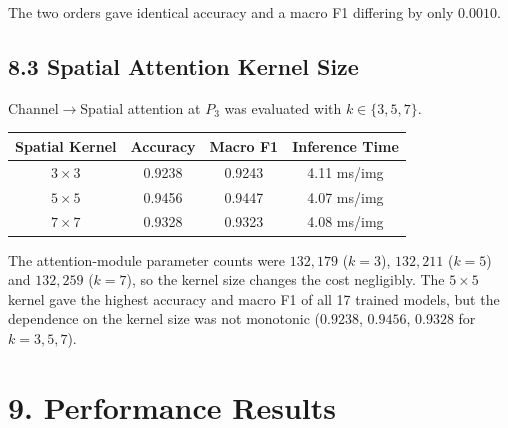\documentclass[10pt]{article}
\begin{document}
The two orders gave identical accuracy and a macro F1 differing by only
$0.0010$.

\subsection*{8.3 Spatial Attention Kernel Size}

Channel$\rightarrow$Spatial attention at $P_3$ was evaluated with
$k\in\{3,5,7\}$.

\begin{center}

\begin{tabular}{|c|c|c|c|}
\hline

\textbf{Spatial Kernel}
&
\textbf{Accuracy}
&
\textbf{Macro F1}
&
\textbf{Inference Time}
\\
\hline

$3\times3$
&
0.9238
&
0.9243
&
4.11 ms/img
\\
\hline

$5\times5$
&
0.9456
&
0.9447
&
4.07 ms/img
\\
\hline

$7\times7$
&
0.9328
&
0.9323
&
4.08 ms/img
\\
\hline

\end{tabular}

\end{center}

The attention-module parameter counts were $132{,}179$ ($k=3$), $132{,}211$
($k=5$) and $132{,}259$ ($k=7$), so the kernel size changes the cost
negligibly. The $5\times5$ kernel gave the highest accuracy and macro F1 of
all 17 trained models, but the dependence on the kernel size was not
monotonic ($0.9238$, $0.9456$, $0.9328$ for $k=3,5,7$).

\section*{9. Performance Results}
\end{document}
